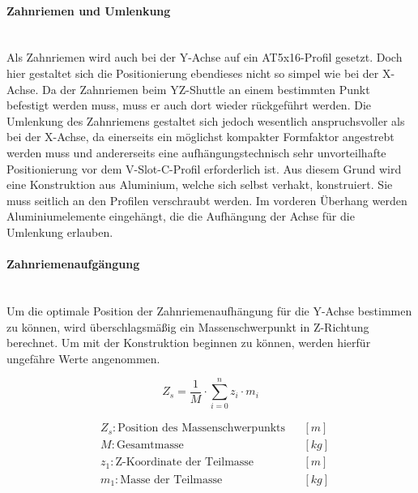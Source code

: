 \paragraph{Zahnriemen und Umlenkung}\mbox{}\\
Als Zahnriemen wird auch bei der Y-Achse auf ein AT5x16-Profil gesetzt. Doch hier gestaltet sich die Positionierung ebendieses nicht so simpel wie bei der X-Achse. Da der Zahnriemen beim YZ-Shuttle an einem bestimmten Punkt befestigt werden muss, muss er auch dort wieder rückgeführt werden. Die Umlenkung des Zahnriemens gestaltet sich jedoch wesentlich anspruchsvoller als bei der X-Achse, da einerseits ein möglichst kompakter Formfaktor angestrebt werden muss und andererseits eine aufhängungstechnisch sehr unvorteilhafte Positionierung vor dem V-Slot-C-Profil erforderlich ist. Aus diesem Grund wird eine Konstruktion aus Aluminium, welche sich selbst verhakt, konstruiert. Sie muss seitlich an den Profilen verschraubt werden. Im vorderen Überhang werden Aluminiumelemente eingehängt, die die Aufhängung der Achse für die Umlenkung erlauben.

\paragraph{Zahnriemenaufgängung}\mbox{}\\
Um die optimale Position der Zahnriemenaufhängung für die Y-Achse bestimmen zu können, wird überschlagsmäßig ein Massenschwerpunkt in Z-Richtung berechnet. Um mit der Konstruktion beginnen zu können, werden hierfür ungefähre Werte angenommen.

\noindent\begin{minipage}{\textwidth}
\begin{minipage}[t]{0.5\textwidth}
    \vspace{7mm}
    \begin{equation*}
        Z_s = \frac{1}{M} \cdot \displaystyle\sum_{i = 0}^{n} z_i \cdot m_i
    \end{equation*}
\end{minipage}%
\begin{minipage}[t]{0.5\textwidth}
    \begin{align*}
        &Z_s: \text{Position des Massenschwerpunkts} & &\left[m\right]\\
        &M: \text{Gesamtmasse} & &\left[kg\right]\\
        &z_1: \text{Z-Koordinate der Teilmasse} & &\left[m\right] \\
        &m_1: \text{Masse der Teilmasse} & &\left[kg\right]
    \end{align*}
\end{minipage}
\end{minipage}

